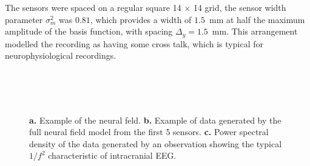\documentclass[10pt,a4paper]{article}
\begin{document}
The sensors were spaced on a regular square 14 $\times$ 14 grid, the sensor width parameter $\sigma^2_m$ was $0.81$, which provides a width of $1.5$~mm at half the maximum amplitude of the basis function, with spacing $\Delta_y=1.5$~mm. This arrangement modelled the recording as having some cross talk, which is typical for neurophysiological recordings. 
\begin{figure}
   	\begin{center}
    		 \\
    		 \\
   		 \\
   	\end{center}
   	\caption{\textbf{a.} Example of the neural feld. \textbf{b.} Example of data generated by the full neural field model from the first 5 sensors. \textbf{c.} Power spectral density of the data generated by an observation showing the typical $1/f^2$ characteristic of intracranial EEG.} 
\label{fig:experimental design}
\end{figure}
\end{document}

